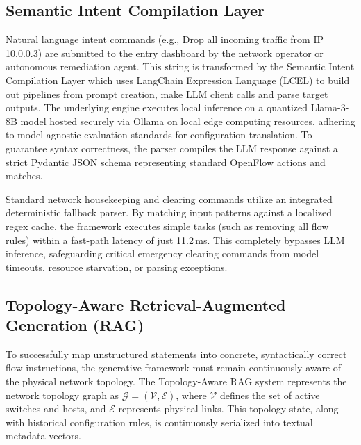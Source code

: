 \documentclass[conference]{IEEEtran}
\begin{document}
\subsection{Semantic Intent Compilation Layer}
Natural language intent commands (e.g., Drop all incoming traffic from IP 10.0.0.3) are submitted to the entry dashboard by the network operator or autonomous remediation agent. This string is transformed by the Semantic Intent Compilation Layer which uses LangChain Expression Language (LCEL) to build out pipelines from prompt creation, make LLM client calls and parse target outputs. The underlying engine executes local inference on a quantized Llama-3-8B model hosted securely via Ollama on local edge computing resources, adhering to model-agnostic evaluation standards for configuration translation. To guarantee syntax correctness, the parser compiles the LLM response against a strict Pydantic JSON schema representing standard OpenFlow actions and matches.

Standard network housekeeping and clearing commands utilize an integrated deterministic fallback parser. By matching input patterns against a localized regex cache, the framework executes simple tasks (such as removing all flow rules) within a fast-path latency of just 11.2\,ms. This completely bypasses LLM inference, safeguarding critical emergency clearing commands from model timeouts, resource starvation, or parsing exceptions.

\subsection{Topology-Aware Retrieval-Augmented Generation (RAG)}
To successfully map unstructured statements into concrete, syntactically correct flow instructions, the generative framework must remain continuously aware of the physical network topology. The Topology-Aware RAG system represents the network topology graph as $\mathcal{G} = (\mathcal{V}, \mathcal{E})$, where $\mathcal{V}$ defines the set of active switches and hosts, and $\mathcal{E}$ represents physical links. This topology state, along with historical configuration rules, is continuously serialized into textual metadata vectors.
\end{document}
